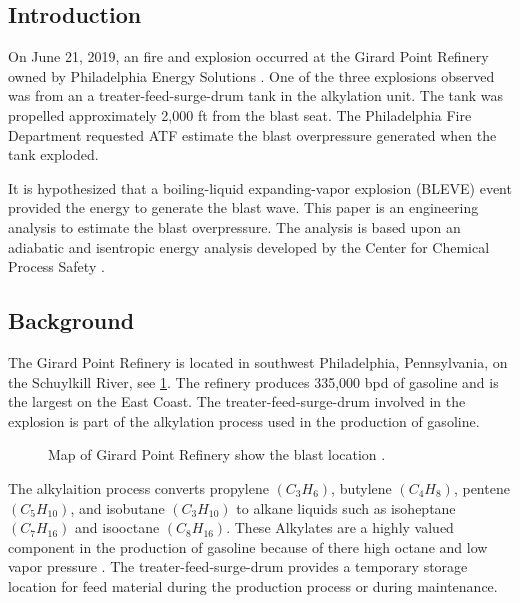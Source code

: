\documentclass[10pt,parskip=half,
toc=sectionentrywithdots,
bibliography=totocnumbered,
captions=tableheading,numbers=noendperiod]{scrartcl}
\begin{document}
    \begingroup
    \let\cleardoublepage\relax
    \let\clearpage\relax\tableofcontents
    \endgroup

\hypertarget{introduction}{%
\subsection{Introduction}\label{introduction}}

On June 21, 2019, an fire and explosion occurred at the Girard Point
Refinery owned by Philadelphia Energy Solutions \cite{Renshaw2019}. One
of the three explosions observed was from an a treater-feed-surge-drum
tank in the alkylation unit. The tank was propelled approximately 2,000
ft from the blast seat. The Philadelphia Fire Department requested ATF
estimate the blast overpressure generated when the tank exploded.

It is hypothesized that a boiling-liquid expanding-vapor explosion
(BLEVE) event provided the energy to generate the blast wave. This paper
is an engineering analysis to estimate the blast overpressure. The
analysis is based upon an adiabatic and isentropic energy analysis
developed by the Center for Chemical Process Safety \cite{Safety2010}.

\hypertarget{background}{%
\subsection{Background}\label{background}}

The Girard Point Refinery is located in southwest Philadelphia,
Pennsylvania, on the Schuylkill River, see \cref{fig:map}. The refinery
produces 335,000 bpd of gasoline and is the largest on the East Coast.
The treater-feed-surge-drum involved in the explosion is part of the
alkylation process used in the production of gasoline.

\begin{figure}[H]
\hypertarget{fig:map}{%
\begin{center}
\end{center}
\caption{Map of Girard Point Refinery show the blast location
\cite{Duchneskie2019}.}\label{fig:map}
}
\end{figure}

The alkylaition process converts propylene \((C_3H_6)\), butylene
\((C_4H_8)\), pentene \((C_5H_{10})\), and isobutane \((C_3H_{10})\) to
alkane liquids such as isoheptane \((C_7H_{16})\) and isooctane
\((C_8H_{16})\). These Alkylates are a highly valued component in the
production of gasoline because of there high octane and low vapor
pressure \cite{flowserve2000}. The treater-feed-surge-drum provides a
temporary storage location for feed material during the production
process or during maintenance.
\end{document}
